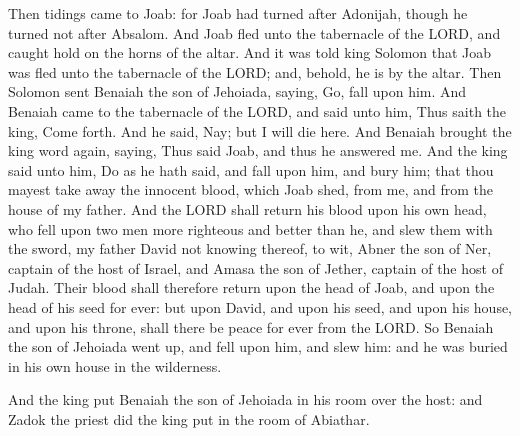  Then tidings came to Joab: for Joab had turned after
Adonijah, though he turned not after Absalom. And Joab fled unto the
tabernacle of the LORD, and caught hold on the horns of the altar.
 And it was told king Solomon that Joab was fled unto the
tabernacle of the LORD; and, behold, he is by the altar. Then Solomon
sent Benaiah the son of Jehoiada, saying, Go, fall upon him.
 And Benaiah came to the tabernacle of the LORD, and said
unto him, Thus saith the king, Come forth. And he said, Nay; but I will
die here. And Benaiah brought the king word again, saying, Thus said
Joab, and thus he answered me.  And the king said unto
him, Do as he hath said, and fall upon him, and bury him; that thou
mayest take away the innocent blood, which Joab shed, from me, and from
the house of my father.  And the LORD shall return his
blood upon his own head, who fell upon two men more righteous and better
than he, and slew them with the sword, my father David not knowing
thereof, to wit, Abner the son of Ner, captain of the host of Israel,
and Amasa the son of Jether, captain of the host of Judah.
 Their blood shall therefore return upon the head of
Joab, and upon the head of his seed for ever: but upon David, and upon
his seed, and upon his house, and upon his throne, shall there be peace
for ever from the LORD.  So Benaiah the son of Jehoiada
went up, and fell upon him, and slew him: and he was buried in his own
house in the wilderness.

 And the king put Benaiah the son of Jehoiada in his room
over the host: and Zadok the priest did the king put in the room of
Abiathar.

